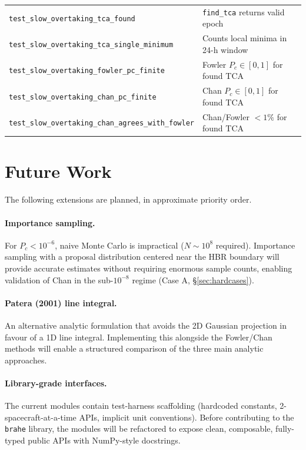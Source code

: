 \documentclass[11pt]{article}
\begin{document}
\begin{table}[htb]
\begin{tabular}{lp{10cm}}
  \texttt{test\_slow\_overtaking\_tca\_found} & \texttt{find\_tca} returns valid epoch \\
  \texttt{test\_slow\_overtaking\_tca\_single\_minimum} & Counts local minima in 24-h window \\
  \texttt{test\_slow\_overtaking\_fowler\_pc\_finite} & Fowler $P_c \in [0,1]$ for found TCA \\
  \texttt{test\_slow\_overtaking\_chan\_pc\_finite} & Chan $P_c \in [0,1]$ for found TCA \\
  \texttt{test\_slow\_overtaking\_chan\_agrees\_with\_fowler} & Chan/Fowler $< 1\%$ for found TCA \\
  \bottomrule
\end{tabular}
\end{table}

\section{Future Work}
\label{sec:future}

The following extensions are planned, in approximate priority order.

\paragraph{Importance sampling.}
For $P_c < 10^{-6}$, naive Monte Carlo is impractical ($N \sim 10^8$ required).
Importance sampling with a proposal distribution centered near the HBR boundary
will provide accurate estimates without requiring enormous sample counts, enabling
validation of Chan in the sub-$10^{-8}$ regime (Case A, \S\ref{sec:hardcases}).

\paragraph{Patera (2001) line integral.}
An alternative analytic formulation that avoids the 2D Gaussian projection in
favour of a 1D line integral.  Implementing this alongside the Fowler/Chan methods
will enable a structured comparison of the three main analytic approaches.

\paragraph{Library-grade interfaces.}
The current modules contain test-harness scaffolding (hardcoded constants,
2-spacecraft-at-a-time APIs, implicit unit conventions).  Before contributing
to the \texttt{brahe} library, the modules will be refactored to expose clean,
composable, fully-typed public APIs with NumPy-style docstrings.
\end{document}
